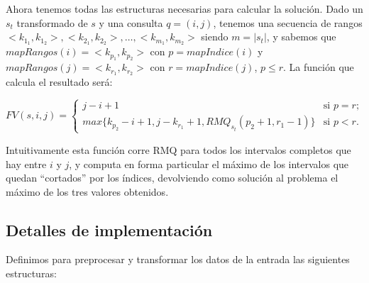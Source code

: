 Ahora tenemos todas las estructuras necesarias para calcular la solución. Dado
un $s_t$ transformado de $s$ y una consulta $q = (i, j)$, tenemos una
secuencia de rangos $<k_{1_1}, k_{1_2}>, <k_{2_1}, k_{2_2}>, \ldots, <k_{m_1}, k_{m_2}>$
siendo $m = |s_t|$, y sabemos que $mapRangos(i) = <k_{p_1}, k_{p_2}>$ con
$p = mapIndice(i)$ y $mapRangos(j) = <k_{r_1}, k_{r_2}>$ con $r = mapIndice(j)$, $p \le r$.
La función que calcula el resultado será:

\[ FV(s, i, j) = \left\{ \begin{array}{ll}
                 j - i + 1 & \mbox{si $p = r$};\\
                 max\{ k_{p_2} - i + 1, j - k_{r_1} + 1, RMQ_{s_t}(p_2 + 1, r_1 - 1) \} & \mbox{si $p < r$}.\end{array} \right. \]
     
Intuitivamente esta función corre RMQ para todos los intervalos completos
que hay entre $i$ y $j$, y computa en forma particular el máximo de los
intervalos que quedan ``cortados'' por los índices, devolviendo como solución al
problema el máximo de los tres valores obtenidos.


\subsection*{Detalles de implementación}

Definimos para preprocesar y transformar los datos de la entrada las siguientes estructuras:

